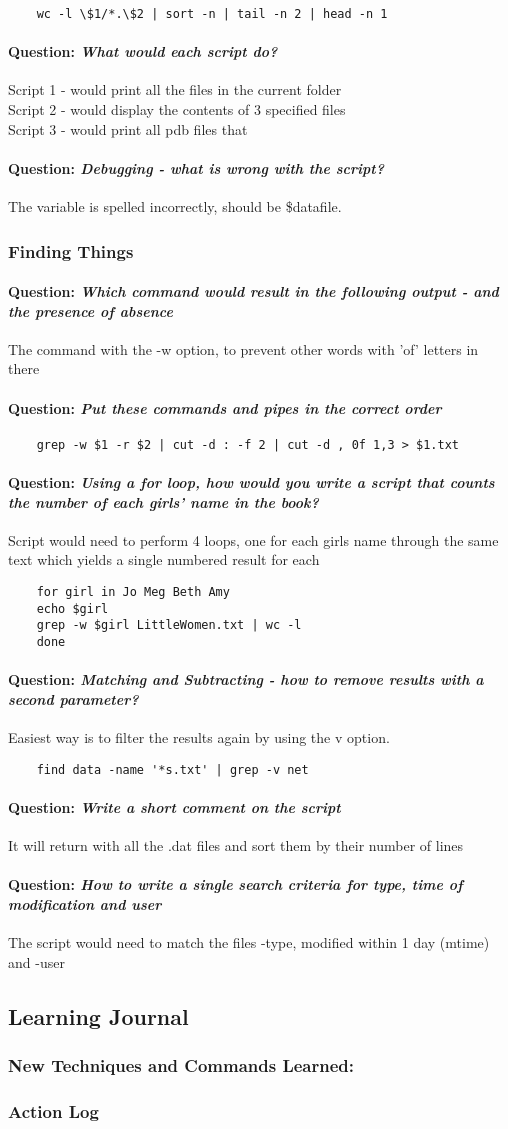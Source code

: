 \documentclass[12pt]{article}
\newcommand{\question}[1]{\paragraph{Question: {\textnormal{\textit{#1}}} ~\\}}
\begin{document}
\begin{verbatim}
    wc -l \$1/*.\$2 | sort -n | tail -n 2 | head -n 1
\end{verbatim}

\question{What would each script do?}
Script 1 - would print all the files in the current folder\\
Script 2 - would display the contents of 3 specified files \\
Script 3 - would print all pdb files that

\question{Debugging - what is wrong with the script?}
The variable is spelled incorrectly, should be \$datafile.

\subsubsection{Finding Things}
\question{Which command would result in the following output - and the presence of absence}

The command with the -w option, to prevent other words with 'of' letters in there
\question{Put these commands and pipes in the correct order}
\begin{verbatim}
    grep -w $1 -r $2 | cut -d : -f 2 | cut -d , 0f 1,3 > $1.txt
\end{verbatim}

\question{Using a for loop, how would you write a script that counts the number of each girls' name in the book?}
Script would need to perform 4 loops, one for each girls name through the same text which yields a single numbered result for each
\begin{verbatim}
    for girl in Jo Meg Beth Amy
    echo $girl
    grep -w $girl LittleWomen.txt | wc -l
    done
\end{verbatim}

\question{Matching and Subtracting - how to remove results with a second parameter?}
Easiest way is to filter the results again by using the v option.
\begin{verbatim}
    find data -name '*s.txt' | grep -v net
\end{verbatim}

\question{Write a short comment on the script}
It will return with all the .dat files and sort them by their number of lines 

\question{How to write a single search criteria for type, time of modification and user}
The script would need to match the files -type, modified within 1 day (mtime) and -user
\subsection{Learning Journal}

\subsubsection{New Techniques and Commands Learned:}

\subsubsection{Action Log}
\end{document}
